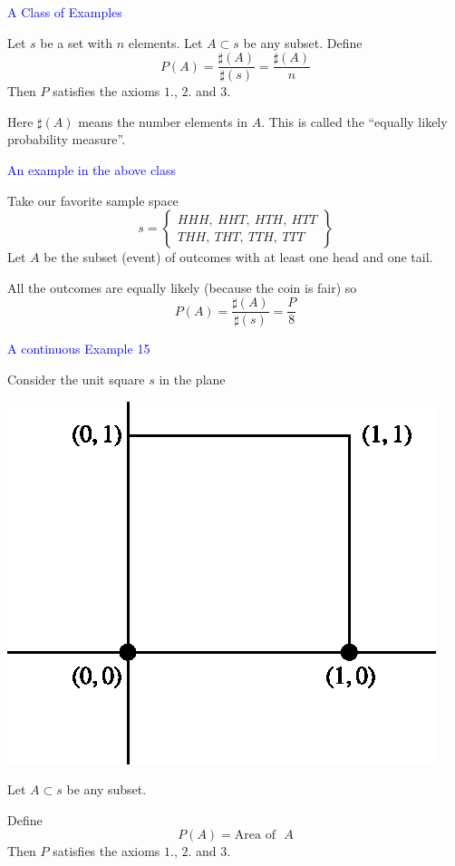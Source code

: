 \documentclass[landscape]{slides}
\begin{document}
\begin{slide}
\textcolor{blue}{\large{A Class of Examples}}

Let $s$ be a set with $n$ elements. Let $A\subset s$ be any subset. Define
$$
P(A)=\dfrac{\sharp (A)}{\sharp (s)}=\dfrac{\sharp(A)}{n}
$$
Then $P$ satisfies the axioms $1.$, $2.$ and $3$.

Here $\sharp (A)$ means the number elements in $A$. This is called the ``equally likely probability measure''.
\end{slide}

\begin{slide}
\textcolor{blue}{\large{An example in the above class}}

Take our favorite sample space
$$
s=
\left\{
\begin{array}{c}
HHH, \ HHT, \ HTH, \ HTT\\[3pt]
THH, \ THT, \ TTH, \ TTT
\end{array}
\right\}
$$
Let $A$ be the subset (event) of outcomes with at least one head and one tail.

All the outcomes are equally likely (because the coin is fair) so
$$
P(A)=\dfrac{\sharp (A)}{\sharp (s)}=\dfrac{P}{8}
$$
\end{slide}

\begin{slide}
\textcolor{blue}{\large{A continuous Example 15}}

Consider the unit square $s$ in the plane
\begin{center}
\includegraphics{fig2.eps}
\end{center}

Let $A\subset s$ be any subset.

Define
$$
P(A)=\text{Area of~ } A
$$
Then $P$ satisfies the axioms $1.$, $2.$ and $3$.
\end{slide}
\end{document}
